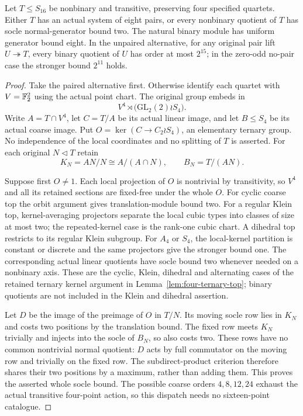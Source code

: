 \begin{lemma}\label{lem:actual-quartet-source}
Let $T\leq S_{16}$ be nonbinary and transitive, preserving four specified
quartets. Either $T$ has an actual system of eight pairs, or every
nonbinary quotient of $T$ has socle normal-generator bound two.
The natural binary module has uniform generator bound eight.
In the unpaired alternative, for any original pair lift
$U\twoheadrightarrow T$, every binary quotient of $U$ has order at most
$2^{15}$; in the zero-odd no-pair case the
stronger bound $2^{11}$ holds.
\end{lemma}
\begin{proof}
Take the paired alternative first. Otherwise identify each quartet with
$V=\mathbb F_2^2$ using the actual point chart. The original group embeds in
\[
 V^4\rtimes\bigl(\mathrm{GL}_2(2)\wr S_4\bigr).
\]
Write $A=T\cap V^4$, let $C=T/A$ be its actual linear image, and
let $B\leq S_4$ be its actual coarse image. Put
$O=\ker(C\to C_2\wr S_4)$, an elementary ternary group. No independence
of the local coordinates and no splitting of $T$ is asserted.
For each original $N\lhd T$ retain
\[
 K_N=AN/N\cong A/(A\cap N),\qquad B_N=T/(AN).
\]

Suppose first $O\ne1$. Each local projection of $O$ is nontrivial by
transitivity, so $V^4$ and all its retained sections are fixed-free
under the whole $O$. For cyclic coarse top the orbit argument gives
translation-module bound two. For a regular Klein top, kernel-averaging
projectors separate the local cubic types into classes of size at most
two; the repeated-kernel case is the rank-one cubic chart. A dihedral
top restricts to its regular Klein subgroup. For $A_4$ or $S_4$, the
local-kernel partition is constant or discrete and the same projectors
give the stronger bound one. The corresponding actual linear quotients
have socle bound two whenever needed on a nonbinary axis. These are the
cyclic, Klein, dihedral and alternating cases of the retained ternary
kernel argument in Lemma~\ref{lem:four-ternary-top}; binary quotients
are not included in the Klein and dihedral assertion.

Let $D$ be the image of the preimage of $O$ in $T/N$. Its moving socle
row lies in $K_N$ and costs two positions by the translation bound.
The fixed row meets $K_N$ trivially and injects into the socle of $B_N$,
so also costs two. These rows have no common nontrivial normal quotient:
$D$ acts by full commutator on the moving row and trivially on the fixed
row. The subdirect-product criterion therefore shares their two positions
by a maximum, rather than adding them. This proves the asserted whole
socle bound. The possible coarse orders $4,8,12,24$ exhaust the actual
transitive four-point action, so this dispatch needs no sixteen-point
catalogue.


\end{proof}
